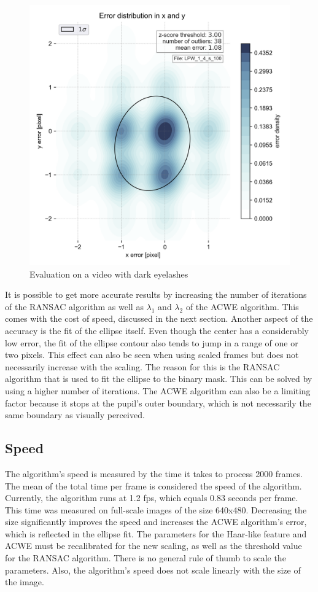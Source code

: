 \begin{figure}[h]
    \centering
    \includegraphics[width=0.9\linewidth]{plots/LPW_1_4_s_100.png} 
\caption{Evaluation on a video with dark eyelashes}
\label{fig:dark_eyelashes_eval}
\end{figure}
\clearpage
It is possible to get more accurate results by increasing the number of iterations of the RANSAC algorithm as well as $\lambda_1$ and $\lambda_2$ of the ACWE algorithm. This comes with the cost of speed, discussed in the next section. 
Another aspect of the accuracy is the fit of the ellipse itself. Even though the center has a considerably low error, the fit of the ellipse contour also tends to jump in a range of one or two pixels. This effect can also be seen when using scaled frames but does not necessarily increase with the scaling. The reason for this is the RANSAC algorithm that is used to fit the ellipse to the binary mask. This can be solved by using a higher number of iterations. The ACWE algorithm can also be a limiting factor because it stops at the pupil's outer boundary, which is not necessarily the same boundary as visually perceived.

\subsection{Speed}
The algorithm's speed is measured by the time it takes to process 2000 frames. The mean of the total time per frame is considered the speed of the algorithm. Currently, the algorithm runs at 1.2 fps, which equals 0.83  seconds per frame. This time was measured on full-scale images of the size 640x480. Decreasing the size significantly improves the speed and increases the ACWE algorithm's error, which is reflected in the ellipse fit. The parameters for the Haar-like feature and ACWE must be recalibrated for the new scaling, as well as the threshold value for the RANSAC algorithm. There is no general rule of thumb to scale the parameters. Also,  the algorithm's speed does not scale linearly with the size of the image.
